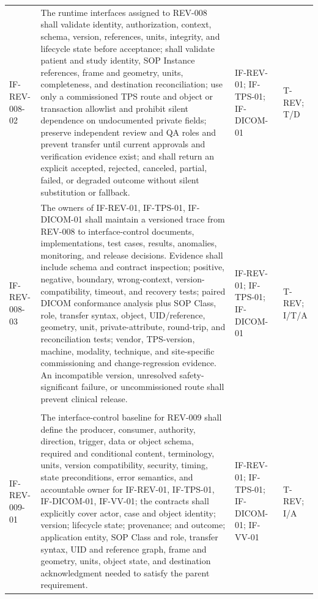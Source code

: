 \documentclass[11pt,letterpaper]{article}
\begin{document}
\begin{scriptsize}
\begin{longtable}{@{}L{0.14\textwidth}L{0.49\textwidth}L{0.19\textwidth}L{0.10\textwidth}@{}}
\addlinespace[2pt]
\mbox{IF-REV-008-02} & The runtime interfaces assigned to REV-008 shall validate identity, authorization, context, schema, version, references, units, integrity, and lifecycle state before acceptance; shall validate patient and study identity, SOP Instance references, frame and geometry, units, completeness, and destination reconciliation; use only a commissioned TPS route and object or transaction allowlist and prohibit silent dependence on undocumented private fields; preserve independent review and QA roles and prevent transfer until current approvals and verification evidence exist; and shall return an explicit accepted, rejected, canceled, partial, failed, or degraded outcome without silent substitution or fallback. & IF-REV-01; IF-TPS-01; IF-DICOM-01 & T-REV; T\slash\allowbreak{}D \\
\addlinespace[2pt]
\mbox{IF-REV-008-03} & The owners of IF-REV-01, IF-TPS-01, IF-DICOM-01 shall maintain a versioned trace from REV-008 to interface-control documents, implementations, test cases, results, anomalies, monitoring, and release decisions. Evidence shall include schema and contract inspection; positive, negative, boundary, wrong-context, version-compatibility, timeout, and recovery tests; paired DICOM conformance analysis plus SOP Class, role, transfer syntax, object, UID\slash\allowbreak{}reference, geometry, unit, private-attribute, round-trip, and reconciliation tests; vendor, TPS-version, machine, modality, technique, and site-specific commissioning and change-regression evidence. An incompatible version, unresolved safety-significant failure, or uncommissioned route shall prevent clinical release. & IF-REV-01; IF-TPS-01; IF-DICOM-01 & T-REV; I\slash\allowbreak{}T\slash\allowbreak{}A \\
\addlinespace[2pt]
 \\
\addlinespace[2pt]
\mbox{IF-REV-009-01} & The interface-control baseline for REV-009 shall define the producer, consumer, authority, direction, trigger, data or object schema, required and conditional content, terminology, units, version compatibility, security, timing, state preconditions, error semantics, and accountable owner for IF-REV-01, IF-TPS-01, IF-DICOM-01, IF-VV-01; the contracts shall explicitly cover actor, case and object identity; version; lifecycle state; provenance; and outcome; application entity, SOP Class and role, transfer syntax, UID and reference graph, frame and geometry, units, object state, and destination acknowledgment needed to satisfy the parent requirement. & IF-REV-01; IF-TPS-01; IF-DICOM-01; IF-VV-01 & T-REV; I\slash\allowbreak{}A \\

\end{longtable}
\end{scriptsize}
\end{document}
